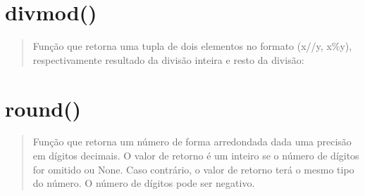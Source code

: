 \documentclass[letterpaper,10pt,brazil]{sphinxmanual}
\begin{document}
\begin{sphinxVerbatim}[commandchars=\\\{\}]
\end{sphinxVerbatim}


\section{divmod()}
\label{\detokenize{content/built-ins:divmod}}\begin{quote}

Função que retorna uma tupla de dois elementos no formato (x//y, x\%y), respectivamente resultado da divisão inteira e resto da divisão:
\end{quote}

\begin{sphinxVerbatim}[commandchars=\\\{\}]
   
\end{sphinxVerbatim}

\begin{sphinxVerbatim}[commandchars=\\\{\}]
\end{sphinxVerbatim}


\section{round()}
\label{\detokenize{content/built-ins:round}}\begin{quote}

Função que retorna um número de forma arredondada dada uma precisão em dígitos decimais.
O valor de retorno é um inteiro se o número de dígitos for omitido ou None. Caso contrário, o valor de retorno terá o mesmo tipo do número. O número de dígitos pode ser negativo.
\end{quote}

\begin{sphinxVerbatim}[commandchars=\\\{\}]
\end{sphinxVerbatim}

\begin{sphinxVerbatim}[commandchars=\\\{\}]
\end{sphinxVerbatim}
\end{document}
